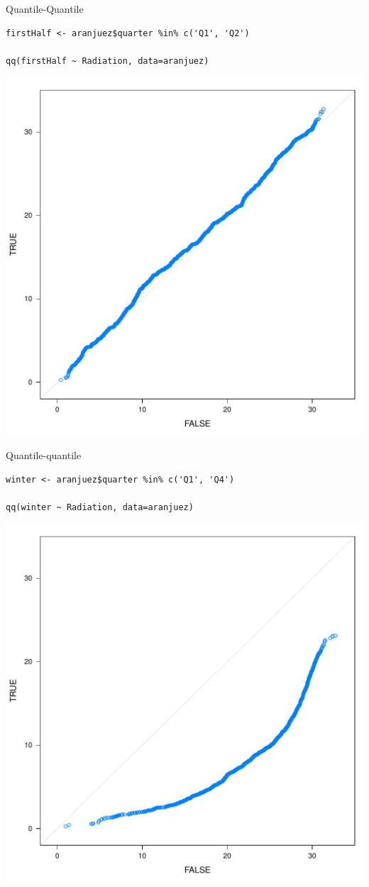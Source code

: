 \documentclass[xcolor={usenames,svgnames,dvipsnames}]{beamer}
\begin{document}
\begin{frame}[fragile,label=sec-2-1-25]{Quantile-Quantile}
 \lstset{language=R,numbers=none}
\begin{lstlisting}
firstHalf <- aranjuez$quarter %in% c('Q1', 'Q2')

qq(firstHalf ~ Radiation, data=aranjuez)
\end{lstlisting}

\includegraphics[width=.9\linewidth]{figs/qqHalf.pdf}
\end{frame}
\begin{frame}[fragile,label=sec-2-1-26]{Quantile-quantile}
 \lstset{language=R,numbers=none}
\begin{lstlisting}
winter <- aranjuez$quarter %in% c('Q1', 'Q4')

qq(winter ~ Radiation, data=aranjuez)
\end{lstlisting}

\includegraphics[width=.9\linewidth]{figs/qqWinter.pdf}
\end{frame}
\end{document}
